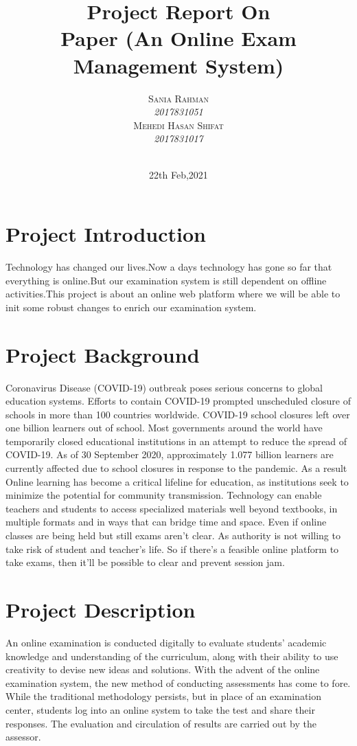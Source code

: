 \documentclass[10pt]{article}
\title{ 
  Project Report On \\  Paper (An Online Exam Management System)
}
\author{
    \textsc{Sania Rahman}\\
    \small\emph{2017831051}\\

    \textsc{Mehedi Hasan Shifat}\\
    \small\emph{2017831017}\\\\
}
\date{22th Feb,2021}
\begin{document}
\maketitle

\pagebreak

\tableofcontents
\pagebreak

\section{Project Introduction}

Technology has changed our lives.Now a days technology has gone so far that everything is online.But our examination system is still dependent on offline activities.This project is about an online web platform where we will be able to init some robust changes to enrich our examination system.


\section{Project Background}

Coronavirus Disease (COVID-19) outbreak poses serious concerns to global education
systems. Efforts to contain COVID-19 prompted unscheduled closure of schools in more
than 100 countries worldwide. COVID-19 school closures left over one billion learners
out of school.
Most governments around the world have temporarily closed educational institutions in an attempt to reduce the spread of COVID-19. As of 30 September 2020,
approximately 1.077 billion learners are currently affected due to school closures in
response to the pandemic.
As a result Online learning has become a critical lifeline for education, as institutions
seek to minimize the potential for community transmission. Technology can enable
teachers and students to access specialized materials well beyond textbooks, in multiple
formats and in ways that can bridge time and space.
Even if online classes are being held but still exams aren’t clear. As authority is not
willing to take risk of student and teacher’s life. So if there’s a feasible online platform
to take exams, then it’ll be possible to clear and prevent session jam.

\section{Project Description}

An online examination is conducted digitally to evaluate students’ academic knowledge and understanding of the curriculum, along with their ability to use creativity to devise new ideas and solutions.
With the advent of the online examination system, the new method of conducting assessments has come to fore. While the traditional methodology persists, but in place of an examination center, students log into an online system to take the test and share their responses. The evaluation and circulation of results are carried out by the assessor.
\end{document}
